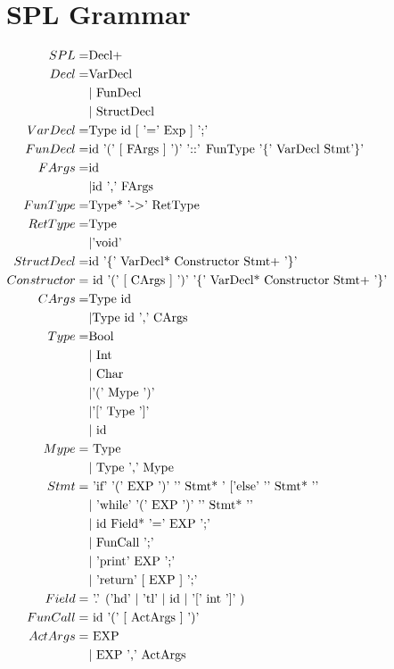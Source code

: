 \documentclass[10pt,a4paper]{article}
\begin{document}
\appendix
\section{SPL Grammar}
\begin{math}
\centering
\begin{aligned}
SPL =& \text{Decl+}\\
Decl  =& \text{VarDecl}
 \\&| \text{ FunDecl }
 \\&| \text{ StructDecl}\\
VarDecl =& \text{Type id [ '=' Exp ] ';'}\\
FunDecl =& \text{id '(' [ FArgs ] ')' '::' FunType '\{' VarDecl Stmt'\}' }\\
FArgs =& \text{id }
 \\&| \text{id ',' FArgs}\\
FunType =& \text{Type* '-$>$' RetType}\\
RetType =& \text{Type}
 \\ &| \text{'void'} \\
StructDecl =& \text{id '\{' VarDecl* Constructor Stmt+ '\}'}\\
Constructor =&\text{ id '(' [ CArgs ] ')' '\{' VarDecl* Constructor Stmt+ '\}' }\\
CArgs =& \text{Type id }
 \\&| \text{Type id ',' CArgs}\\
Type =& \text{Bool}
 \\&| \text{ Int}
 \\&| \text{ Char}
 \\&| \text{'(' Mype ')'} 
 \\&| \text{'[' Type ']'} 
 \\&|\text{ id }\\
Mype =&\text{ Type}
 \\&|\text{ Type ',' Mype}\\
Stmt =&\text{ 'if' '(' EXP ')' '{' Stmt* '} ['else' '{' Stmt* '}'}
 \\&|\text{ 'while' '(' EXP ')' '{' Stmt* '}'}
 \\&|\text{ id Field* '=' EXP ';'}
 \\&|\text{ FunCall ';'}
 \\&|\text{ 'print' EXP ';'}
 \\&|\text{ 'return' [ EXP ] ';' }\\
Field =&\text{ '.' ('hd' $|$ 'tl' $|$ id $|$ '[' int ']' ) }\\
FunCall =&\text{ id '(' [ ActArgs ] ')'} \\
ActArgs =&\text{ EXP }
 \\&|\text{ EXP ',' ActArgs }
\end{aligned}
\end{math}
\end{document}
